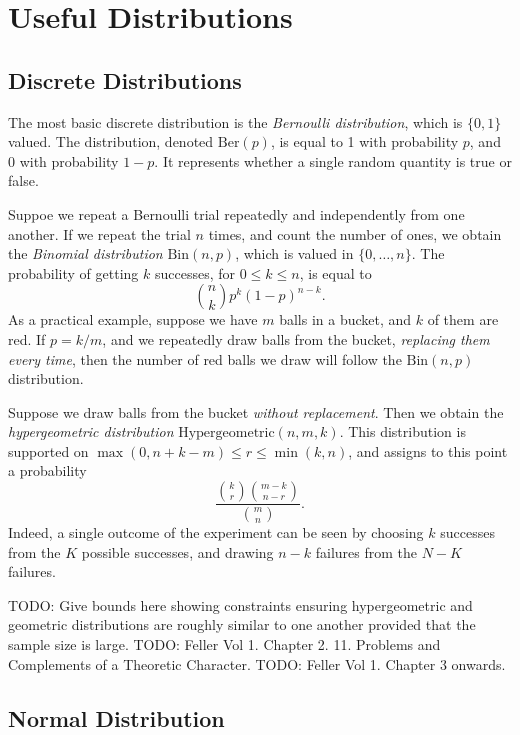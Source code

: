 \chapter{Useful Distributions}

\section{Discrete Distributions}

The most basic discrete distribution is the \emph{Bernoulli distribution}, which is $\{ 0, 1 \}$ valued. The distribution, denoted $\text{Ber}(p)$, is equal to 1 with probability $p$, and 0 with probability $1 - p$. It represents whether a single random quantity is true or false.

Suppoe we repeat a Bernoulli trial repeatedly and independently from one another. If we repeat the trial $n$ times, and count the number of ones, we obtain the \emph{Binomial distribution} $\text{Bin}(n,p)$, which is valued in $\{ 0, \dots, n \}$. The probability of getting $k$ successes, for $0 \leq k \leq n$, is equal to
%
\[ {n \choose k} p^k (1 - p)^{n-k}. \]
%
As a practical example, suppose we have $m$ balls in a bucket, and $k$ of them are red. If $p = k/m$, and we repeatedly draw balls from the bucket, \emph{replacing them every time}, then the number of red balls we draw will follow the $\text{Bin}(n,p)$ distribution.

Suppose we draw balls from the bucket \emph{without replacement}. Then we obtain the \emph{hypergeometric distribution} $\text{Hypergeometric}(n,m,k)$. This distribution is supported on $\max(0,n+k-m) \leq r \leq \min(k,n)$, and assigns to this point a probability
%
\[ \frac{{k \choose r} {m-k \choose n-r}}{{m \choose n}}. \]
%
Indeed, a single outcome of the experiment can be seen by choosing $k$ successes from the $K$ possible successes, and drawing $n-k$ failures from the $N-K$ failures.

TODO: Give bounds here showing constraints ensuring hypergeometric and geometric distributions are roughly similar to one another provided that the sample size is large.
TODO: Feller Vol 1. Chapter 2. 11. Problems and Complements of a Theoretic Character.
TODO: Feller Vol 1. Chapter 3 onwards.



\section{Normal Distribution}

